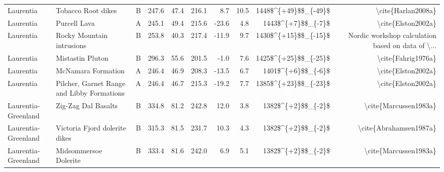 \begin{longtable}{p{1 in}p{1 in}rrrrrrrr}
                     Laurentia &                                 Tobacco Root dikes &      B &     247.6 &      47.4 & 216.1 &   8.7 &      10.5 &   1448\$\textasciicircum \{+49\}\$\$\_\{-49\}\$ &                                 \textbackslash cite\{Harlan2008a\} \\
                     Laurentia &                                       Purcell Lava &      A &     245.1 &      49.4 & 215.6 & -23.6 &       4.8 &     1443\$\textasciicircum \{+7\}\$\$\_\{-7\}\$ &                                 \textbackslash cite\{Elston2002a\} \\
                     Laurentia &                          Rocky Mountain intrusions &      B &     253.8 &      40.3 & 217.4 & -11.9 &       9.7 &   1430\$\textasciicircum \{+15\}\$\$\_\{-15\}\$ &  Nordic workshop calculation based on data of \textbackslash ... \\
                     Laurentia &                                   Mistastin Pluton &      B &     296.3 &      55.6 & 201.5 &  -1.0 &       7.6 &   1425\$\textasciicircum \{+25\}\$\$\_\{-25\}\$ &                                 \textbackslash cite\{Fahrig1976a\} \\
                     Laurentia &                                 McNamara Formation &      A &     246.4 &      46.9 & 208.3 & -13.5 &       6.7 &     1401\$\textasciicircum \{+6\}\$\$\_\{-6\}\$ &                                 \textbackslash cite\{Elston2002a\} \\
                     Laurentia &         Pilcher, Garnet Range and Libby Formations &      A &     246.4 &      46.7 & 215.3 & -19.2 &       7.7 &   1385\$\textasciicircum \{+23\}\$\$\_\{-23\}\$ &                                 \textbackslash cite\{Elston2002a\} \\
           Laurentia-Greenland &                                Zig-Zag Dal Basalts &      B &     334.8 &      81.2 & 242.8 &  12.0 &       3.8 &     1382\$\textasciicircum \{+2\}\$\$\_\{-2\}\$ &                              \textbackslash cite\{Marcussen1983a\} \\
           Laurentia-Greenland &                      Victoria Fjord dolerite dikes &      B &     315.3 &      81.5 & 231.7 &  10.3 &       4.3 &     1382\$\textasciicircum \{+2\}\$\$\_\{-2\}\$ &                             \textbackslash cite\{Abrahamsen1987a\} \\
           Laurentia-Greenland &                              Midsommersoe Dolerite &      B &     333.4 &      81.6 & 242.0 &   6.9 &       5.1 &     1382\$\textasciicircum \{+2\}\$\$\_\{-2\}\$ &                              \textbackslash cite\{Marcussen1983a\} \\

\end{longtable}
